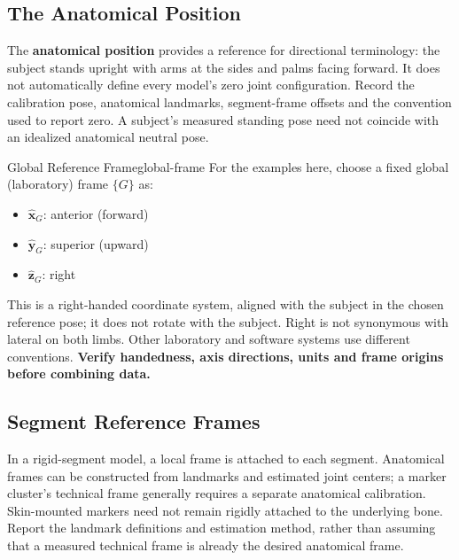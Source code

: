 \subsection{The Anatomical Position}

The \textbf{anatomical position} provides a reference for directional terminology:
the subject stands upright with arms at the sides and palms facing forward.
It does not automatically define every model's zero joint configuration.
Record the calibration pose, anatomical landmarks, segment-frame offsets and
the convention used to report zero. A subject's measured standing pose need
not coincide with an idealized anatomical neutral pose.

\begin{definition}[unbreakable]{Global Reference Frame}{global-frame}
  For the examples here, choose a fixed global (laboratory) frame $\{G\}$ as:
  \begin{itemize}
    \item $\hat{\bm{x}}_G$: anterior (forward)
    \item $\hat{\bm{y}}_G$: superior (upward)
    \item $\hat{\bm{z}}_G$: right
  \end{itemize}
  This is a right-handed coordinate system, aligned with the subject in the
  chosen reference pose; it does not rotate with the subject. Right is not
  synonymous with lateral on both limbs. Other laboratory and software systems
  use different conventions. \textbf{Verify handedness, axis directions,
  units and frame origins before combining data.}
\end{definition}

\subsection{Segment Reference Frames}

In a rigid-segment model, a local frame is attached to each segment. Anatomical
frames can be constructed from landmarks and estimated joint centers; a marker
cluster's technical frame generally requires a separate anatomical calibration.
Skin-mounted markers need not remain rigidly attached to the underlying bone.
Report the landmark definitions and estimation method, rather than assuming
that a measured technical frame is already the desired anatomical frame.


